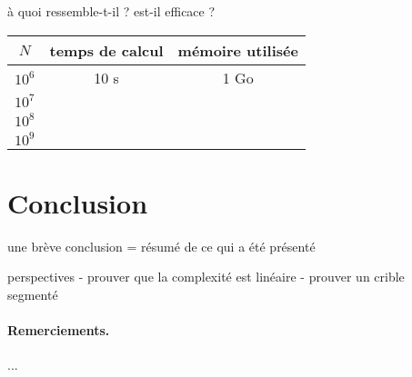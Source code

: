 \documentclass[a4paper]{easychair}
\begin{document}
à quoi ressemble-t-il ?
est-il efficace ?

\begin{center}
  \begin{tabular}{|c|c|c|}
    \hline
    $N$ & temps de calcul & mémoire utilisée \\
    \hline\hline
    $10^6$ & 10 s & 1 Go \\\hline
    $10^7$ & & \\\hline
    $10^8$ & & \\\hline
    $10^9$ & & \\\hline
  \end{tabular}
\end{center}

\section{Conclusion}
\label{sec:conclusion}

une brève conclusion = résumé de ce qui a été présenté

perspectives
- prouver que la complexité est linéaire
- prouver un crible segmenté~\cite{crible-segmente}


\paragraph{Remerciements.} ...



\end{document}
